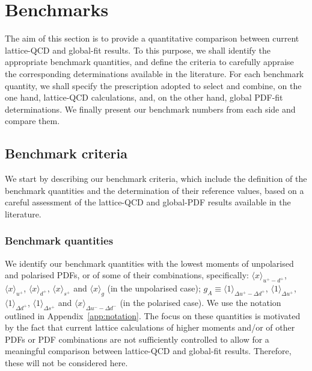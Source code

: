 \section{Benchmarks}
\label{sec:benchmarking}

The aim of this section is to provide a quantitative comparison between 
current lattice-QCD and global-fit results.
%
To this purpose, we shall identify the appropriate benchmark quantities, 
and define the criteria to carefully appraise the corresponding determinations
available in the literature.
%
For each benchmark quantity, we shall specify the prescription adopted to 
select and combine, on the one hand, lattice-QCD calculations, and, on the 
other hand, global PDF-fit determinations.
%
We finally present our benchmark numbers from each side and compare them.

\subsection{Benchmark criteria}
\label{subsec:BC}

We start by describing our benchmark criteria, which include the definition
of the benchmark quantities and the determination of their reference values,
based on a careful assessment of the lattice-QCD and global-PDF results 
available in the literature.

\subsubsection{Benchmark quantities}
\label{subsubsec:BQ}

We identify our benchmark quantities with the lowest moments of unpolarised 
and polarised PDFs, or of some of their combinations, specifically: 
$\langle x\rangle_{u^+-d^+}$, $\langle x \rangle_{u^+}$, $\langle x \rangle_{d^+}$, 
$\langle x \rangle_{s^+}$ and $\langle x \rangle_{g}$ (in the unpolarised case); 
$g_A\equiv\langle 1 \rangle_{\Delta u^+ - \Delta d ^+}$, 
$\langle 1 \rangle_{\Delta u^+}$, $\langle 1 \rangle_{\Delta d^+}$,  
$\langle 1 \rangle_{\Delta s^+}$ and $\langle x \rangle_{\Delta u^- - \Delta d^-}$ 
(in the polarised case).
%
We use the notation outlined in Appendix~\ref{app:notation}.
%
The focus on these quantities is motivated by the fact that
current lattice calculations of higher moments and/or of other PDFs or PDF 
combinations are not sufficiently controlled to allow for a meaningful 
comparison between lattice-QCD and global-fit results.
%
Therefore, these will not be considered here. 

